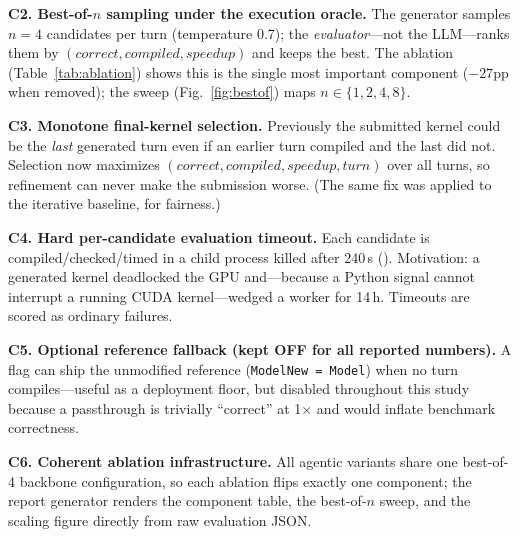 \documentclass[conference]{IEEEtran}
\begin{document}
\textbf{C2. Best-of-$n$ sampling under the execution oracle.}
The generator samples $n{=}4$ candidates per turn (temperature 0.7); the
\emph{evaluator}---not the LLM---ranks them by
$(\textit{correct},\textit{compiled},\textit{speedup})$ and keeps the best.
The ablation (Table~\ref{tab:ablation}) shows this is the single most important
component ($-27$pp when removed); the sweep (Fig.~\ref{fig:bestof}) maps
$n\in\{1,2,4,8\}$.

\textbf{C3. Monotone final-kernel selection.}
Previously the submitted kernel could be the \emph{last} generated turn even if an
earlier turn compiled and the last did not. Selection now maximizes
$(\textit{correct},\textit{compiled},\textit{speedup},\textit{turn})$ over all
turns, so refinement can never make the submission worse. (The same fix was applied
to the iterative baseline, for fairness.)

\textbf{C4. Hard per-candidate evaluation timeout.}
Each candidate is compiled/checked/timed in a child process killed after 240\,s
(). Motivation: a generated
kernel deadlocked the GPU and---because a Python signal cannot interrupt a running
CUDA kernel---wedged a worker for 14\,h. Timeouts are scored as ordinary failures.

\textbf{C5. Optional reference fallback (kept OFF for all reported numbers).}
A flag can ship the unmodified reference (\texttt{ModelNew = Model}) when no turn
compiles---useful as a deployment floor, but disabled throughout this study because
a passthrough is trivially ``correct'' at 1$\times$ and would inflate benchmark
correctness.

\textbf{C6. Coherent ablation infrastructure.}
All agentic variants share one best-of-4 backbone configuration, so each ablation
flips exactly one component; the report generator renders the component table, the
best-of-$n$ sweep, and the scaling figure directly from raw evaluation JSON.
\end{document}
